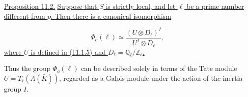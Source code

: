 \medskip
\noindent
\underline{Proposition 11.2.} \underline{Suppose that $S$ is strictly
local, and let $\ell$ be a prime number different from $p$. Then there is
a canonical isomorphism}

\begin{equation}\tag{11.2.1}
\Phi_o(\ell)\simeq
 \frac{(U\otimes D_\ell)^I}{U^I\otimes D_\ell},
\end{equation}
\underline{where $U$ is defined in (11.1.5) and
$D_\ell=\mathbb Q_\ell/\mathbb Z_\ell$.}

Thus the group $\Phi_o(\ell)$ can be described solely in terms of the
Tate module $U=T_\ell(A(\bar K))$, regarded as a Galois module under the
action of the inertia group $I$.

